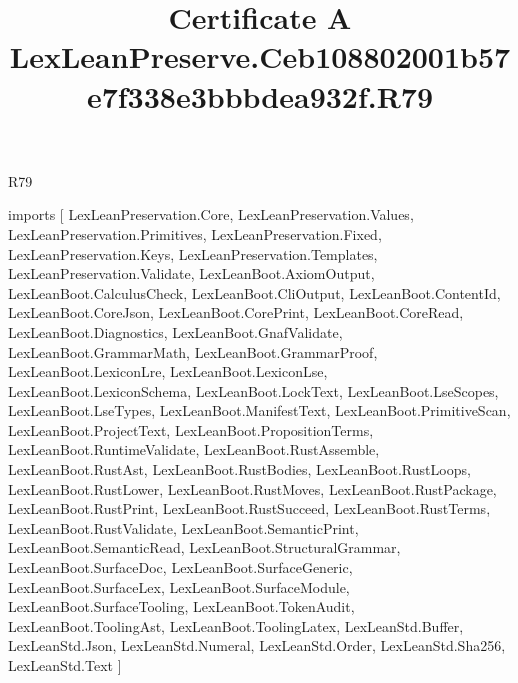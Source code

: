 \begin{lexlean}{R79}
\title{Certificate A LexLeanPreserve.Ceb108802001b57e7f338e3bbbdea932f.R79}
\begin{coremodule}
imports [
  LexLeanPreservation.Core,
  LexLeanPreservation.Values,
  LexLeanPreservation.Primitives,
  LexLeanPreservation.Fixed,
  LexLeanPreservation.Keys,
  LexLeanPreservation.Templates,
  LexLeanPreservation.Validate,
  LexLeanBoot.AxiomOutput,
  LexLeanBoot.CalculusCheck,
  LexLeanBoot.CliOutput,
  LexLeanBoot.ContentId,
  LexLeanBoot.CoreJson,
  LexLeanBoot.CorePrint,
  LexLeanBoot.CoreRead,
  LexLeanBoot.Diagnostics,
  LexLeanBoot.GnafValidate,
  LexLeanBoot.GrammarMath,
  LexLeanBoot.GrammarProof,
  LexLeanBoot.LexiconLre,
  LexLeanBoot.LexiconLse,
  LexLeanBoot.LexiconSchema,
  LexLeanBoot.LockText,
  LexLeanBoot.LseScopes,
  LexLeanBoot.LseTypes,
  LexLeanBoot.ManifestText,
  LexLeanBoot.PrimitiveScan,
  LexLeanBoot.ProjectText,
  LexLeanBoot.PropositionTerms,
  LexLeanBoot.RuntimeValidate,
  LexLeanBoot.RustAssemble,
  LexLeanBoot.RustAst,
  LexLeanBoot.RustBodies,
  LexLeanBoot.RustLoops,
  LexLeanBoot.RustLower,
  LexLeanBoot.RustMoves,
  LexLeanBoot.RustPackage,
  LexLeanBoot.RustPrint,
  LexLeanBoot.RustSucceed,
  LexLeanBoot.RustTerms,
  LexLeanBoot.RustValidate,
  LexLeanBoot.SemanticPrint,
  LexLeanBoot.SemanticRead,
  LexLeanBoot.StructuralGrammar,
  LexLeanBoot.SurfaceDoc,
  LexLeanBoot.SurfaceGeneric,
  LexLeanBoot.SurfaceLex,
  LexLeanBoot.SurfaceModule,
  LexLeanBoot.SurfaceTooling,
  LexLeanBoot.TokenAudit,
  LexLeanBoot.ToolingAst,
  LexLeanBoot.ToolingLatex,
  LexLeanStd.Buffer,
  LexLeanStd.Json,
  LexLeanStd.Numeral,
  LexLeanStd.Order,
  LexLeanStd.Sha256,
  LexLeanStd.Text
]


\end{coremodule}
\end{lexlean}
